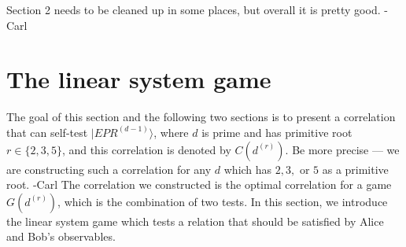 \documentclass[11pt,letterpaper]{article}
\newcommand{\ket}[1]{|#1\rangle}
\DeclarePairedDelimiter{\set}{\lbrace}{\rbrace}
\DeclarePairedDelimiter{\ip}{\langle}{\rangle}
\newcommand{\Z}{\mathbb{Z}}
\newcommand{\1}{\mathbb{1}}
\newcommand{\J}{\mathcal{J}}
\newcommand{\EPR}[1]{EPR^{(#1)}}
\newcommand{\G}{G}
\newcommand{\dr}[1]{d^{(#1)}}
\def\carl#1{{\color{blue} #1 -Carl}}
\newtheorem{definition}[theorem]{Definition}
\theoremstyle{definition}
\begin{document}
\carl{Section 2 needs to be cleaned up in some places, but overall it is pretty good.}




\section{The linear system game}
\label{sec:lsg}
The goal of this section and the following two sections is to 
present a correlation that can self-test $\ket{\EPR{d-1}}$, 
where $d$ is prime and has primitive root $r \in \{2, 3, 5\}$,
and this correlation is denoted by $C(\dr{r})$.  \carl{Be more precise --- we are constructing
such a correlation for any $d$ which has $2, 3,$ or $5$ as a primitive root.}
The correlation we constructed is the optimal correlation for a game $\G(\dr{r})$, which is the combination of two tests.
In this section, we introduce the linear system game which tests a relation that should be satisfied by 
Alice and Bob's observables.
\end{document}
